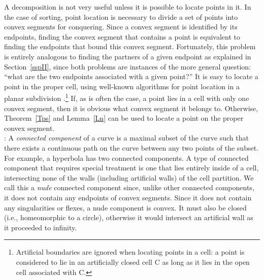 A decomposition is not very useful unless it is possible to locate points in it. 
In the case of sorting, point location is necessary to divide a set of points
into convex segments for conquering.
Since a convex segment is identified by its endpoints, finding the convex 
segment that contains a point is equivalent to finding the endpoints that bound 
this convex segment.
Fortunately, this problem is entirely analogous to finding the partners of a given
endpoint as explained in Section~\ref{sspII}, since both problems are 
instances of the more general question: ``what are the two endpoints associated 
with a given point?''
It is easy to locate a point in the proper cell, using well-known algorithms 
for point location in a planar subdivision \cite{kirk,PS}.\footnote{Artificial 
	boundaries are ignored when locating points in a cell: a point
	is considered to lie in an artificially closed cell C as long as it lies
	in the open cell associated with C.}
If, as is often the case, a point lies in a cell with only one convex segment, 
then it is obvious what convex segment it belongs to.  
Otherwise, Theorem~\ref{Tps} and Lemma~\ref{Ln} can be used 
to locate a point on the proper convex segment.\\[3pt]
%
:
A {\em connected component} of a curve is a maximal subset of the curve such that 
there exists a continuous path on the curve between any two points of the subset.
For example, a hyperbola has two connected components.
A type of connected component that requires special treatment is one that
lies entirely inside of a cell, intersecting none of the walls (including
artificial walls) of the cell partition.
We call this a {\em nude} connected component since, unlike other connected 
components, it does not contain any endpoints of convex segments.
Since it does not contain any singularities or flexes, a nude component is convex.
It must also be closed (i.e., homeomorphic to a circle), otherwise it would 
intersect an artificial wall as it proceeded to infinity.
%
